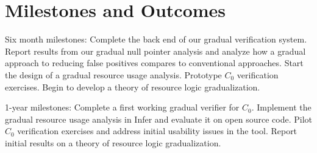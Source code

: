 \documentclass[12pt,twocolumn]{article}
\begin{document}
\begin{sloppypar}
\vspace{-2ex}
\section{Milestones and Outcomes}
\vspace{-2ex}

Six month milestones: Complete the back end of our gradual verification system.  Report results from our gradual null pointer analysis and analyze how a gradual approach to reducing false positives compares to conventional approaches.  Start the design of a gradual resource usage analysis.  Prototype $C_0$ verification exercises.  Begin to develop a theory of resource logic gradualization.

1-year milestones: Complete a first working gradual verifier for $C_0$.  Implement the gradual resource usage analysis in Infer and evaluate it on open source code.  Pilot $C_0$ verification exercises and address initial usability issues in the tool.  Report initial results on a theory of resource logic gradualization.




\end{sloppypar}
\end{document}
